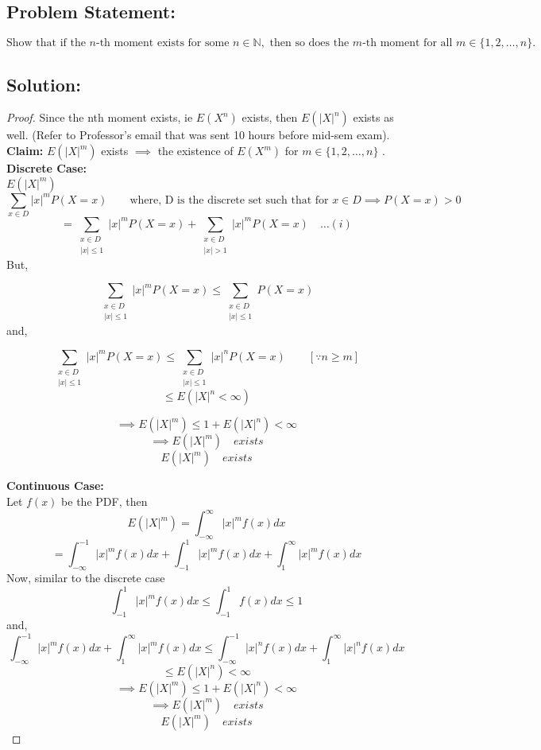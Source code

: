 \documentclass{article}
\theoremstyle{definition}
\begin{document}
\subsection{Problem Statement:}
\begin{mdframed}[style = MyFrame]
\[
\text{Show that if the } n\text{-th moment exists for some } n \in \mathbb{N}, \text{ then so does the } m\text{-th moment for all } m \in \{1,2,\ldots,n\}.
\]

\end{mdframed}
\subsection{Solution:}

\begin{proof}
    

Since the nth moment exists, ie $E(X^n)$ exists, then $E(|X|^n)$ exists as well. (Refer to Professor's email that was sent 10 hours before mid-sem exam). \\
\textbf{Claim:} $E(|X|^m)$ exists $\implies$ the existence of $E(X^m)$ for $ m \in \{1,2,\ldots,n\} $ .\\
\textbf{Discrete Case:}\\
$E(|X|^m)$ \\
\[
\sum_{x \in D} |x|^m P(X=x) \quad \quad \text{where, D is the discrete set such that for $x \in D \implies P(X=x)>0$  }

\]
\[
= \sum_{\substack{x \in D \\ |x| \leq 1}} |x|^m P(X=x) + \sum\limits_{\substack{ x \in D \\ |x|>1}} |x|^m P(X=x) \quad \dots (i)
\]
But,

\[
\sum_{\substack{x \in D \\ |x| \leq 1}} |x|^m P(X=x) \leq \sum_{\substack{x \in D \\ |x| \leq 1}} P(X=x)
\]
and,

\[
\sum_{\substack{x \in D \\ |x| \leq 1}} |x|^m P(X=x) \leq \sum_{\substack{x \in D \\ |x| \leq 1}} |x|^n P(X=x) \quad \quad [\because n \geq m]
\]
\[
\leq E(|X|^n < \infty)
\]

\[
\implies E(|X|^m) \leq 1 + E(|X|^n) < \infty
\]
\[
\implies E(|X|^m) \quad exists
\]
\[
E(|X|^m) \quad exists
\]


\textbf{Continuous Case:}\\
Let $f(x)$ be the PDF, then 
\[
E(|X|^m ) = \int_{-\infty}^{\infty} |x|^m f(x) dx

\]
\[
= \int_{-\infty}^{-1} |x|^m f(x) dx + \int_{-1}^{1} |x|^m f(x) dx + \int_{1}^{\infty} |x|^m f(x) dx
\]
Now, similar to the discrete case 
\[
\int_{-1}^{1} |x|^m f(x) dx \leq \int_{-1}^{1} f(x) dx \leq 1
\]
and, 
\[
\int_{-\infty}^{-1} |x|^m f(x) dx + \int_{1}^{\infty} |x|^m f(x) dx \leq \int_{-\infty}^{-1} |x|^n f(x) dx + \int_{1}^{\infty} |x|^n f(x) dx
\]
\[
\leq E(|X|^n) < \infty
\]
\[
\implies E(|X|^m) \leq 1 + E(|X|^n) < \infty
\]
\[
\implies E(|X|^m) \quad exists
\]
\[
E(|X|^m) \quad exists
\]






\end{proof}
\end{document}
